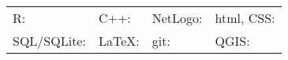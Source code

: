 \documentclass[hidelinks]{report}
\begin{document}
\begin{center}
	\begin{tabular}{l l l l}
		
		R: \textcolor{blue}{\faCircle \faCircle \faCircle \faCircle \faCircle} & 
		C++: \textcolor{blue}{\faCircle \faCircle \faCircleO \faCircleO \faCircleO} & 
		NetLogo: \textcolor{blue}{\faCircle \faCircle \faCircleO \faCircleO \faCircleO} &
		html, CSS: \textcolor{blue}{\faCircle \faCircleO \faCircleO \faCircleO \faCircleO} \\
	
		SQL/SQLite: \textcolor{blue}{\faCircle \faCircleO \faCircleO \faCircleO \faCircleO} &
		LaTeX: \textcolor{blue}{\faCircle \faCircle \faCircle \faCircleO \faCircleO} &
		git: \textcolor{blue}{\faCircle \faCircle \faCircle \faCircleO \faCircleO} &
		QGIS: \textcolor{blue}{\faCircle \faCircle \faCircleO \faCircleO \faCircleO} \\

	\end{tabular}
\end{center}
\end{document}
